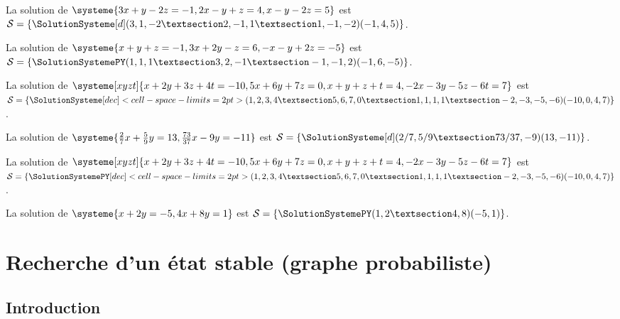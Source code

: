 \documentclass[french,a4paper,11pt]{article}
\begin{document}
\begin{PresentationCode}{}
La solution de $\systeme{3x+y-2z=-1,2x-y+z=4,x-y-2z=5}$ est $\mathcal{S}=%
\left\lbrace \SolutionSysteme[d](3,1,-2 § 2,-1,1 § 1,-1,-2)(-1,4,5) \right\rbrace$.\\
\end{PresentationCode}

\begin{PresentationCode}{}
La solution de $\systeme{x+y+z=-1,3x+2y-z=6,-x-y+2z=-5}$ est $\mathcal{S}=%
\left\lbrace \SolutionSystemePY(1,1,1 § 3,2,-1 § -1,-1,2)(-1,6,-5) \right\rbrace$.
\end{PresentationCode}

\begin{PresentationCode}{}
La solution de $\systeme[xyzt]{x+2y+3z+4t=-10,5x+6y+7z=0,x+y+z+t=4,-2x-3y-5z-6t=7}$
est $\mathcal{S}=%
	\left\lbrace
		\SolutionSysteme%
		[dec]<cell-space-limits=2pt>%
		(1,2,3,4 § 5,6,7,0 § 1,1,1,1 § -2,-3,-5,-6)(-10,0,4,7)%
\right\rbrace$.
\end{PresentationCode}

\begin{PresentationCode}{}
La solution de $\systeme{\frac{2}{7}x + \frac{5}{9}y = 13,\frac{73}{37} x - 9y=-11}$
est $\mathcal{S}=
\left\lbrace \SolutionSysteme[d](2/7,5/9 § 73/37,-9)(13,-11) \right\rbrace$.
\end{PresentationCode}

\begin{PresentationCode}{}
La solution de $\systeme[xyzt]{x+2y+3z+4t=-10,5x+6y+7z=0,x+y+z+t=4,-2x-3y-5z-6t=7}$
est $\mathcal{S}=%
\left\lbrace
	\SolutionSystemePY%
		[dec]<cell-space-limits=2pt>%
		(1,2,3,4 § 5,6,7,0 § 1,1,1,1 § -2,-3,-5,-6)(-10,0,4,7)%
\right\rbrace$.
\end{PresentationCode}

\begin{PresentationCode}{}
La solution de $\systeme{x+2y=-5,4x+8y=1}$ est $\mathcal{S}=%
\left\lbrace \SolutionSystemePY(1,2 § 4,8)(-5,1) \right\rbrace$.
\end{PresentationCode}

\section{Recherche d'un état stable (graphe probabiliste)}

\subsection{Introduction}
\end{document}
